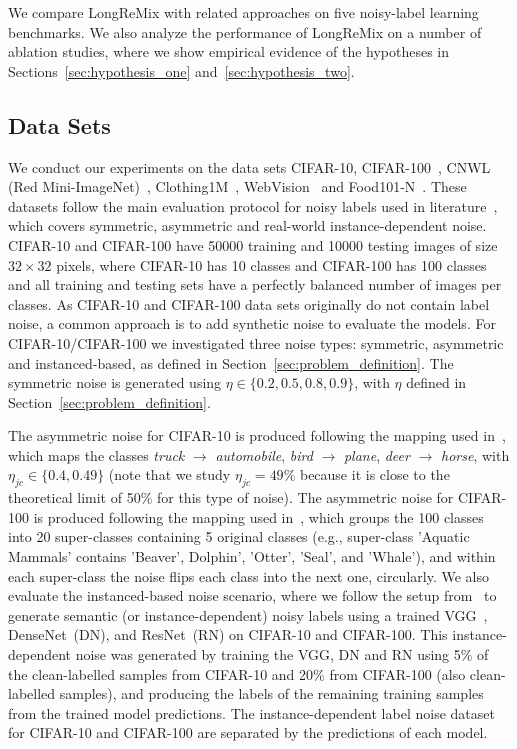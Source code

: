\documentclass[review]{elsarticle}
\begin{document}
We compare LongReMix with related approaches on five noisy-label learning benchmarks. We also analyze the performance of LongReMix on a number of ablation studies, where we show empirical evidence of the hypotheses in Sections~\ref{sec:hypothesis_one} and~\ref{sec:hypothesis_two}. 


\subsection{Data Sets}
\label{sec:datasets}

We conduct our experiments on the data sets  CIFAR-10, CIFAR-100~\cite{krizhevsky2009learning}, CNWL (Red Mini-ImageNet)~\cite{jiang2020beyond},
Clothing1M~\cite{xiao2015learning}, WebVision~\cite{li2017WebVision} and Food101-N~\cite{lee2018cleannet}. These datasets follow the main evaluation protocol for noisy labels used in literature~\cite{li2020dividemix,ren2018learning,shu2019meta}, which covers symmetric, asymmetric and real-world instance-dependent noise. CIFAR-10 and CIFAR-100 have 50000 training and 10000 testing images of size $32 \times 32$ pixels, where CIFAR-10 has 10 classes and CIFAR-100 has 100 classes and all training and testing sets have a perfectly balanced number of images per classes. As CIFAR-10 and CIFAR-100 data sets originally do not contain label noise, a common approach is to add synthetic noise to evaluate the models. For CIFAR-10/CIFAR-100 we investigated three  noise types: symmetric, asymmetric and instanced-based, as defined in Section~\ref{sec:problem_definition}. 
The symmetric noise is generated using $\eta \in \{0.2, 0.5, 0.8, 0.9\}$, with $\eta$  defined in Section~\ref{sec:problem_definition}.


 The asymmetric noise for CIFAR-10 is produced following the mapping used in~\cite{li2020dividemix}, which maps the classes \emph{truck} $\to$ \emph{automobile}, \emph{bird} $\to$ \emph{plane}, \emph{deer} $\to$ \emph{horse}, with $\eta_{jc} \in \{0.4, 0.49\}$ (note that we study $\eta_{jc}=49\%$ because it is close to the theoretical limit of 50\% for this type of noise). The asymmetric noise for CIFAR-100 is produced following the mapping used in~\cite{patrini2017making}, which groups the 100 classes into 20 super-classes containing 5 original classes (e.g., super-class 'Aquatic Mammals' contains 'Beaver', Dolphin', 'Otter', 'Seal', and 'Whale'), and within each super-class the noise flips each class into the next one, circularly.  We also evaluate the instanced-based noise scenario, where 
 we follow the setup from~\cite{rog} to generate semantic (or instance-dependent) noisy labels using a trained VGG~\cite{vgg}, DenseNet~(DN), and ResNet~(RN) on CIFAR-10 and CIFAR-100. This instance-dependent noise was generated by training the VGG, DN and RN using 5\% of the clean-labelled samples from CIFAR-10 and 20\% from CIFAR-100 (also clean-labelled samples), and producing the labels of the remaining training samples from the trained model predictions. 
 The instance-dependent label noise dataset for CIFAR-10 and CIFAR-100 are separated by the predictions of each model.
 
\end{document}
